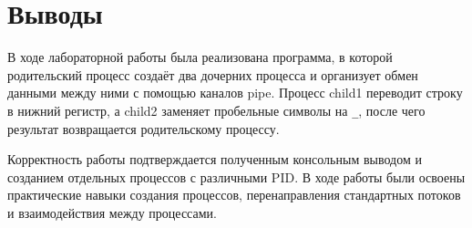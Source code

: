 \section{Выводы}

В ходе лабораторной работы была реализована программа, в которой родительский процесс создаёт два дочерних процесса и организует обмен данными между ними с помощью каналов pipe. Процесс child1 переводит строку в нижний регистр, а child2 заменяет пробельные символы на \texttt{\_}, после чего результат возвращается родительскому процессу.

Корректность работы подтверждается полученным консольным выводом и созданием отдельных процессов с различными PID. В ходе работы были освоены практические навыки создания процессов, перенаправления стандартных потоков и взаимодействия между процессами.

\pagebreak
